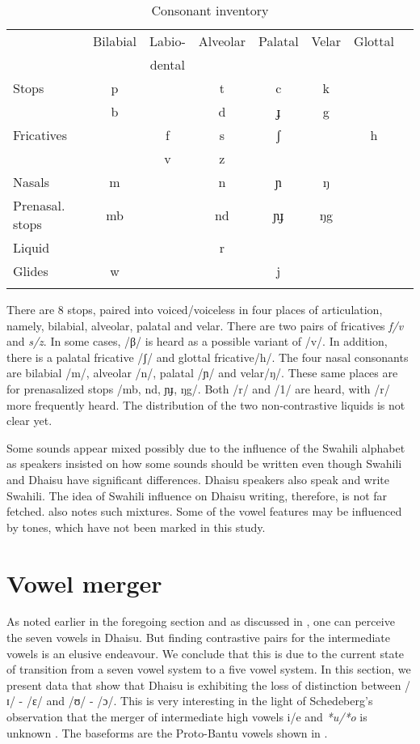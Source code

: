 \documentclass[output=paper,colorlinks,citecolor=brown]{langscibook}
\begin{document}
\begin{table}
	\caption {Consonant inventory \citep[5]{RugemaliraEtAl2019} }
 	\label{tab:ngonyani:2}
    \begin{tabular}{l c c c c c c c}
    \lsptoprule 
        & Bilabial & Labio-  & Alveolar & Palatal & Velar & Glottal\\
        & & dental\\
    \midrule
        Stops & p & & t & c & k\\
        & b &  &   d & ɟ & g\\
        Fricatives & & f &   s & ʃ & & h\\
        & & v &   z\\
        Nasals & m & &    n & ɲ & ŋ\\
        Prenasal. stops & mb & &  nd & ɲɟ & ŋg \\
        Liquid & & &    r\\
        Glides & w & &    & j\\
    \lspbottomrule
    \end{tabular}
\end{table}

There are 8 stops, paired into voiced/voiceless in four places of articulation, namely, bilabial, alveolar, palatal and velar. There are two pairs of fricatives \textit{f/v} and \textit{s/z}. In some cases, /β/ is heard as a possible variant of /v/. In addition, there is a palatal fricative /ʃ/ and glottal fricative/h/. The four nasal consonants are bilabial /m/, alveolar /n/, palatal /ɲ/ and velar/ŋ/. These same places are for prenasalized stops /mb, nd, ɲɟ, ŋg/. Both /r/ and /1/ are heard, with /r/ more frequently heard. The distribution of the two non-contrastive liquids is not clear yet.
 
Some sounds appear mixed possibly due to the influence of the Swahili alphabet as speakers insisted on how some sounds should be written even though Swahili and Dhaisu have significant differences. Dhaisu speakers also speak and write Swahili. The idea of Swahili influence on Dhaisu writing, therefore, is not far fetched. \cite{Nurse2000} also notes such mixtures. Some of the vowel features may be influenced by tones, which have not been marked in this study.


\section{Vowel merger}\label{sec:ngonyani:3}

As noted earlier in the foregoing section and as discussed in \cite{Nurse2000}, one can perceive the seven vowels in Dhaisu. But finding contrastive pairs for the intermediate vowels is an elusive endeavour. We conclude that this is due to the current state of transition from a seven vowel system to a five vowel system. In this section, we present data that show that Dhaisu is exhibiting the loss of distinction between /ɪ/ - /ɛ/ and /ʊ/ - /ɔ/. This is very interesting in the light of Schedeberg's observation that the merger of intermediate high vowels i/e and \textit{*u/*o} is unknown \citep[74]{Schadeberg1995}. The baseforms are the Proto-Bantu vowels  shown in .
\end{document}
